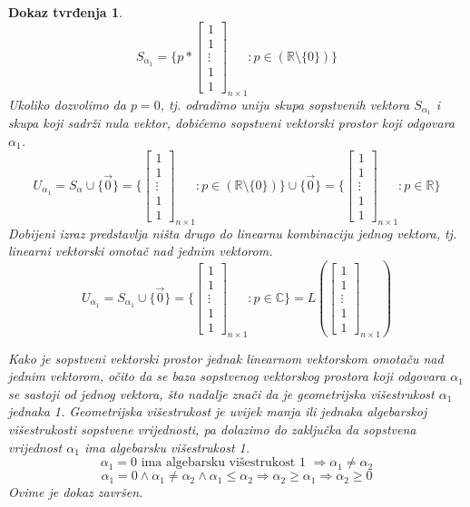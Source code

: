 \documentclass[11pt]{article}
\newtheorem*{custom_proof}{Dokaz tvrđenja}
\begin{document}
\begin{custom_proof}
	\[
	S_{\alpha_1} = \{p *
	\begin{bmatrix} 
	1 \\ 1 \\ \vdots \\ 1 \\ 1
	\end{bmatrix}_{n \times 1} : p \in (\mathbb{R} \setminus \{0\}) \} 
	\]
	Ukoliko dozvolimo da $p=0$, tj. odradimo uniju skupa sopstvenih vektora $S_{\alpha_1}$ i skupa koji sadrži nula vektor,
	dobićemo sopstveni vektorski prostor koji odgovara $\alpha_1$.
	\[
	U_{\alpha_1} = S_{\alpha} \cup \{\vec{0}\}= \{
	\begin{bmatrix} 
	1 \\ 1 \\ \vdots \\ 1 \\ 1
	\end{bmatrix}_{n \times 1}  : p \in (\mathbb{R} \setminus \{0\}) \} \cup \{\vec{0}\}= \{
	\begin{bmatrix} 
	1 \\ 1 \\ \vdots \\ 1 \\ 1
	\end{bmatrix}_{n \times 1} :  p \in \mathbb{R}\} 
	\]
	Dobijeni izraz predstavlja ništa drugo do linearnu kombinaciju jednog vektora, tj. linearni vektorski omotač nad jednim vektorom.
	\[
	U_{\alpha_1} = S_{\alpha_1} \cup \{\vec{0}\}= \{
	\begin{bmatrix} 
	1 \\ 1 \\ \vdots \\ 1 \\ 1
	\end{bmatrix}_{n \times 1} :  p \in \mathbb{C}\} = L (\begin{bmatrix} 
	1 \\ 1 \\ \vdots \\ 1 \\ 1
	\end{bmatrix}_{n \times 1})
	\]

	Kako je sopstveni vektorski prostor jednak linearnom vektorskom omotaču nad jednim vektorom, 
	očito da se baza sopstvenog vektorskog prostora koji odgovara $\alpha_1$ se sastoji od jednog vektora,
	što nadalje znači da je geometrijska višestrukost $\alpha_1$ jednaka 1.
	Geometrijska višestrukost je uvijek manja ili jednaka algebarskoj višestrukosti sopstvene vrijednosti,
	pa dolazimo do zaključka da sopstvena vrijednost $\alpha_1$ ima algebarsku višestrukost 1.
	\[
	\alpha_1 = 0 \text{ ima algebarsku višestrukost 1 } \Rightarrow \alpha_1 \neq \alpha_2
	\]
	\[
	\alpha_1 = 0  \land \alpha_1 \neq \alpha_2 \land \alpha_1 \leq \alpha_2 \Rightarrow \alpha_2 \ge \alpha_1 \Rightarrow \alpha_2 \ge 0
	\]
	Ovime je dokaz završen.
	\end{custom_proof}
	
\end{document}
